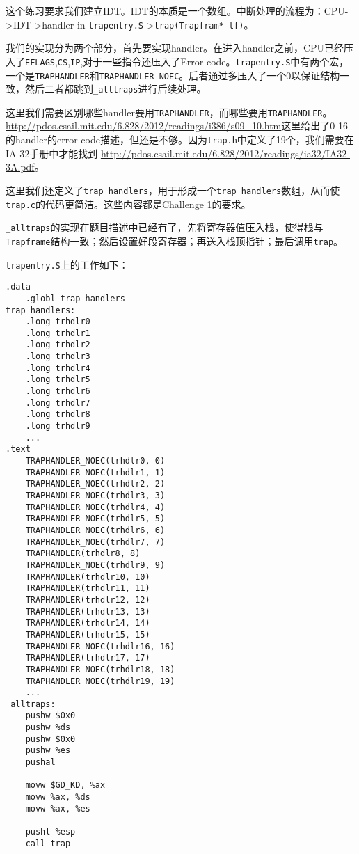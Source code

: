 \documentclass[11pt]{article}
\begin{document}
这个练习要求我们建立IDT。IDT的本质是一个数组。中断处理的流程为：CPU->IDT->handler in \lstinline|trapentry.S|->\lstinline|trap(Trapfram* tf)|。

我们的实现分为两个部分，首先要实现handler。在进入handler之前，CPU已经压入了\lstinline|EFLAGS|,\lstinline|CS|,\lstinline|IP|,对于一些指令还压入了Error code。\lstinline|trapentry.S|中有两个宏，一个是\lstinline|TRAPHANDLER|和\lstinline|TRAPHANDLER_NOEC|。后者通过多压入了一个0以保证结构一致，然后二者都跳到\lstinline|_alltraps|进行后续处理。

这里我们需要区别哪些handler要用\lstinline|TRAPHANDLER|，而哪些要用\lstinline|TRAPHANDLER|。\url{http://pdos.csail.mit.edu/6.828/2012/readings/i386/s09_10.htm}这里给出了0-16的handler的error code描述，但还是不够。因为\lstinline|trap.h|中定义了19个，我们需要在IA-32手册中才能找到 \url{http://pdos.csail.mit.edu/6.828/2012/readings/ia32/IA32-3A.pdf}。

这里我们还定义了\lstinline|trap_handlers|，用于形成一个\lstinline|trap_handlers|数组，从而使\lstinline|trap.c|的代码更简洁。这些内容都是Challenge 1的要求。

\lstinline|_alltraps|的实现在题目描述中已经有了，先将寄存器值压入栈，使得栈与\lstinline|Trapframe|结构一致；然后设置好段寄存器；再送入栈顶指针；最后调用\lstinline|trap|。

\lstinline|trapentry.S|上的工作如下：

\begin{lstlisting}[title=kern/trapentry.S]
.data
	.globl trap_handlers
trap_handlers:
    .long trhdlr0
    .long trhdlr1
    .long trhdlr2
    .long trhdlr3
    .long trhdlr4
    .long trhdlr5
    .long trhdlr6
    .long trhdlr7
    .long trhdlr8
    .long trhdlr9
    ...
.text
	TRAPHANDLER_NOEC(trhdlr0, 0)
	TRAPHANDLER_NOEC(trhdlr1, 1)
	TRAPHANDLER_NOEC(trhdlr2, 2)
	TRAPHANDLER_NOEC(trhdlr3, 3)
	TRAPHANDLER_NOEC(trhdlr4, 4)
	TRAPHANDLER_NOEC(trhdlr5, 5)
	TRAPHANDLER_NOEC(trhdlr6, 6)
	TRAPHANDLER_NOEC(trhdlr7, 7)
	TRAPHANDLER(trhdlr8, 8)
	TRAPHANDLER_NOEC(trhdlr9, 9)
	TRAPHANDLER(trhdlr10, 10)
	TRAPHANDLER(trhdlr11, 11)
	TRAPHANDLER(trhdlr12, 12)
	TRAPHANDLER(trhdlr13, 13)
	TRAPHANDLER(trhdlr14, 14)
	TRAPHANDLER(trhdlr15, 15)
	TRAPHANDLER_NOEC(trhdlr16, 16)
	TRAPHANDLER(trhdlr17, 17)
	TRAPHANDLER_NOEC(trhdlr18, 18)
	TRAPHANDLER_NOEC(trhdlr19, 19)
    ...
_alltraps:
	pushw $0x0
	pushw %ds
	pushw $0x0
	pushw %es
	pushal

	movw $GD_KD, %ax
	movw %ax, %ds
	movw %ax, %es

	pushl %esp
	call trap
\end{lstlisting}
\end{document}
